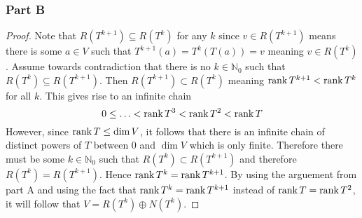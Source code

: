 \documentclass[12pt,titlepage]{extarticle}
\begin{document}
\subsubsection*{Part B}
\begin{proof}
    Note that $R(T^{k+1}) \subseteq R(T^k)$ for any $k$ since $v \in R(T^{k+1})$ means there is some $a \in V$ such that $T^{k+1}(a) = T^k(T(a)) = v$ meaning $v \in R(T^{k})$. Assume towards contradiction that there is no $k \in \mathbb{N}_0$ such that $R(T^k) \subseteq R(T^{k+1})$. Then $R(T^{k+1}) \subset R(T^k)$ meaning $\rank T^{k+1} < \rank T^k$ for all $k$. This gives rise to an infinite chain 
    \[
        0 \leq \ldots <
        \rank T^3 <
        \rank T^2 <
        \rank T
    \]
    However, since $\rank T \leq \dim V$, it follows that there is an infinite chain of distinct powers of $T$ between $0$ and $\dim V$ which is only finite. Therefore there must be some $k \in \mathbb{N}_0$ such that $R(T^k) \subset R(T^{k+1})$ and therefore $R(T^k) = R(T^{k+1})$. Hence $\rank T^k = \rank T^{k+1}$. By using the arguement from part A and using the fact that $\rank T^k = \rank T^{k+1}$ instead of $\rank T = \rank T^2$, it will follow that $V = R(T^k) \oplus N(T^k)$.
\end{proof}
\end{document}
